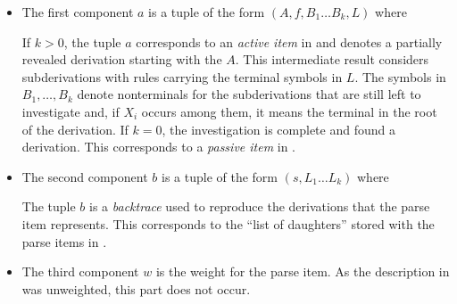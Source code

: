 \documentclass[../../document.tex]{subfiles}
\begin{document}
    \begin{itemize}
        \item The first component \(a\) is a tuple of the form \((A, f, B_1 \ldots B_k, L)\) where
            If \(k>0\), the tuple \(a\) corresponds to an \emph{active item} in  and denotes a partially revealed derivation starting with the  \(A\).
            This intermediate result considers subderivations with rules carrying the terminal symbols in \(L\).
            The symbols in \(B_1, \ldots, B_k\) denote nonterminals for the subderivations that are still left to investigate and, if \(X_i\) occurs among them, it means the terminal in the root of the derivation.
            If \(k=0\), the investigation is complete and found a derivation. This corresponds to a \emph{passive item} in .
        \item The second component \(b\) is a tuple of the form \((s, L_1 \ldots L_k)\) where
            The tuple \(b\) is a \emph{backtrace} used to reproduce the derivations that the parse item represents.
            This corresponds to the ``list of daughters'' stored with the parse items in .
        \item
            The third component \(w\) is the weight for the parse item.
            As the description in  was unweighted, this part does not occur.
    \end{itemize}
\end{document}
